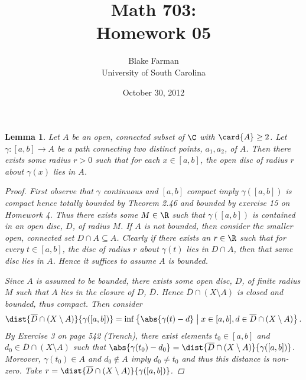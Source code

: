 \documentclass[12pt]{amsart}
\author{Blake Farman\\University of South Carolina}
\title{Math 703:\\Homework 05}
\date{October 30, 2012}
\begin{document}
\maketitle

\newtheorem{setup}{}
\setcounter{setup}{16}
\newtheorem{ex}{}[setup]
\newtheorem{lem}{Lemma}
\theoremstyle{definition}
\newtheorem{defn}{Definition}

\begin{lem}\label{min-radius}
  Let $A$ be an open, connected subset of $\C$ with $\card{A} \geq 2$.
  Let $\gamma \colon [a, b] \rightarrow A$ be a path connecting two distinct points, $a_1, a_2$, of $A$.
  Then there exists some radius $r > 0$ such that for each $x \in [a,b]$, the open disc of radius $r$ about $\gamma(x)$ lies in $A$.
  
  \begin{proof}
    First observe that $\gamma$ continuous and $[a,b]$  compact imply $\gamma([a,b])$ is compact hence totally bounded by Theorem 2.46 and bounded by exercise 15 on Homework 4.
    Thus there exists some $M \in \R$ such that $\gamma([a,b])$ is contained in an open disc, $D$, of radius $M$.
    If $A$ is not bounded, then consider the smaller open, connected set $D \cap A \subseteq A$.
    Clearly if there exists an $r \in \R$ such that for every $t \in [a,b]$, the disc of radius $r$ about $\gamma(t)$ lies in $D \cap A$, then that same disc lies in $A$.
    Hence it suffices to assume $A$ is bounded.
    
    Since $A$ is assumed to be bounded, there exists some open disc, $D$, of finite radius $M$ such that $A$ lies in the closure of $D$, $\overline{D}$.
    Hence $\overline{D} \cap (X \setminus A)$ is closed and bounded, thus compact.
    Then consider $$\dist{\overline{D} \cap (X \setminus{A})}{\gamma([a,b])} = \inf \left\{\abs{\gamma(t) - d} \;\middle\vert\; x \in [a,b], d \in \overline{D} \cap (X \setminus{A})\right\}.$$
    By Exercise 3 on page 542 (Trench), there exist elements $t_0 \in [a,b]$ and $d_0 \in \overline{D} \cap (X \setminus{A})$ such that $\abs{\gamma(t_0) - d_0} = \dist{\overline{D} \cap (X \setminus{A})}{\gamma([a,b])}$.
    Moreover, $\gamma(t_0) \in A$ and $d_0 \not \in A$ imply $d_0 \not = t_0$ and thus this distance is non-zero.
    Take $r = \dist{\overline{D} \cap (X \setminus{A})}{\gamma([a,b])}$.
  \end{proof}
\end{lem}
\end{document}
